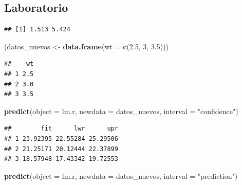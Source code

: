 \documentclass[
  12pt,
]{book}
\newenvironment{Shaded}{\begin{snugshade}}{\end{snugshade}}
\newcommand{\DataTypeTok}[1]{\textcolor[rgb]{0.13,0.29,0.53}{#1}}
\newcommand{\DecValTok}[1]{\textcolor[rgb]{0.00,0.00,0.81}{#1}}
\newcommand{\FloatTok}[1]{\textcolor[rgb]{0.00,0.00,0.81}{#1}}
\newcommand{\KeywordTok}[1]{\textcolor[rgb]{0.13,0.29,0.53}{\textbf{#1}}}
\newcommand{\NormalTok}[1]{#1}
\newcommand{\OperatorTok}[1]{\textcolor[rgb]{0.81,0.36,0.00}{\textbf{#1}}}
\newcommand{\StringTok}[1]{\textcolor[rgb]{0.31,0.60,0.02}{#1}}
\theoremstyle{definition}
\theoremstyle{definition}
\theoremstyle{definition}
\theoremstyle{remark}
\begin{document}
\hypertarget{laboratorio-3}{%
\subsection{Laboratorio}\label{laboratorio-3}}

\begin{Shaded}
\end{Shaded}

\begin{verbatim}
## [1] 1.513 5.424
\end{verbatim}

\begin{Shaded}
\begin{Highlighting}[]
\NormalTok{(datos_nuevos <-}\StringTok{ }\KeywordTok{data.frame}\NormalTok{(}\DataTypeTok{wt =} \KeywordTok{c}\NormalTok{(}\FloatTok{2.5}\NormalTok{, }\DecValTok{3}\NormalTok{, }\FloatTok{3.5}\NormalTok{)))}
\end{Highlighting}
\end{Shaded}

\begin{verbatim}
##    wt
## 1 2.5
## 2 3.0
## 3 3.5
\end{verbatim}

\begin{Shaded}
\begin{Highlighting}[]
\KeywordTok{predict}\NormalTok{(}\DataTypeTok{object =}\NormalTok{ lm.r, }\DataTypeTok{newdata =}\NormalTok{ datos_nuevos, }\DataTypeTok{interval =} \StringTok{"confidence"}\NormalTok{)}
\end{Highlighting}
\end{Shaded}

\begin{verbatim}
##        fit      lwr      upr
## 1 23.92395 22.55284 25.29506
## 2 21.25171 20.12444 22.37899
## 3 18.57948 17.43342 19.72553
\end{verbatim}

\begin{Shaded}
\begin{Highlighting}[]
\KeywordTok{predict}\NormalTok{(}\DataTypeTok{object =}\NormalTok{ lm.r, }\DataTypeTok{newdata =}\NormalTok{ datos_nuevos, }\DataTypeTok{interval =} \StringTok{"prediction"}\NormalTok{)}
\end{Highlighting}
\end{Shaded}
\end{document}
